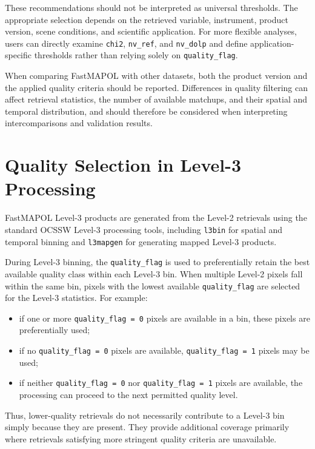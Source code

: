 \documentclass[
  11pt,
  letterpaper,
]{scrreprt}
\providecommand{\tightlist}{%
  \setlength{\itemsep}{0pt}\setlength{\parskip}{0pt}}
\begin{document}
These recommendations should not be interpreted as universal thresholds.
The appropriate selection depends on the retrieved variable, instrument,
product version, scene conditions, and scientific application. For more
flexible analyses, users can directly examine \texttt{chi2},
\texttt{nv\_ref}, and \texttt{nv\_dolp} and define application-specific
thresholds rather than relying solely on \texttt{quality\_flag}.

When comparing FastMAPOL with other datasets, both the product version
and the applied quality criteria should be reported. Differences in
quality filtering can affect retrieval statistics, the number of
available matchups, and their spatial and temporal distribution, and
should therefore be considered when interpreting intercomparisons and
validation results.

\section{Quality Selection in Level-3
Processing}\label{quality-selection-in-level-3-processing}

FastMAPOL Level-3 products are generated from the Level-2 retrievals
using the standard OCSSW Level-3 processing tools, including
\texttt{l3bin} for spatial and temporal binning and \texttt{l3mapgen}
for generating mapped Level-3 products.

During Level-3 binning, the \texttt{quality\_flag} is used to
preferentially retain the best available quality class within each
Level-3 bin. When multiple Level-2 pixels fall within the same bin,
pixels with the lowest available \texttt{quality\_flag} are selected for
the Level-3 statistics. For example:

\begin{itemize}
\tightlist
\item
  if one or more \texttt{quality\_flag\ =\ 0} pixels are available in a
  bin, these pixels are preferentially used;
\item
  if no \texttt{quality\_flag\ =\ 0} pixels are available,
  \texttt{quality\_flag\ =\ 1} pixels may be used;
\item
  if neither \texttt{quality\_flag\ =\ 0} nor
  \texttt{quality\_flag\ =\ 1} pixels are available, the processing can
  proceed to the next permitted quality level.
\end{itemize}

Thus, lower-quality retrievals do not necessarily contribute to a
Level-3 bin simply because they are present. They provide additional
coverage primarily where retrievals satisfying more stringent quality
criteria are unavailable.
\end{document}
